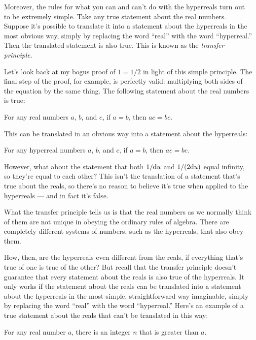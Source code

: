 Moreover, the
rules for what you can and can't do with the hyperreals turn out to be extremely simple. 
Take any true statement about the real numbers. Suppose it's possible to translate it into a statement about
the hyperreals in the most obvious way, simply by replacing the word ``real'' with the word ``hyperreal.''
Then the translated statement is also true. This is known as the \emph{transfer principle}.

Let's look back at my bogus proof of $1=1/2$ in light of this simple principle. The final step of the proof,
for example, is perfectly valid: multiplying both sides of the equation by the same thing. The following
statement about the real numbers is true:

\begin{indentedblock}
For any real numbers $a$, $b$, and $c$, if $a=b$, then $ac=bc$.
\end{indentedblock}

This can be translated in an obvious way into a statement about the hyperreals:

\begin{indentedblock}
For any hyperreal numbers $a$, $b$, and $c$, if $a=b$, then $ac=bc$.
\end{indentedblock}

However, what about the statement that both $1/\textup{d} u$ and $1/(2\textup{d} u)$ equal infinity, so they're
equal to each other? This isn't the translation of a statement that's true about the reals, so there's
no reason to believe it's true when applied to the hyperreals --- and in fact it's false.

What the transfer principle tells us is that the real numbers as we normally
think of them are not unique in obeying the ordinary rules of algebra. There are completely different
systems of numbers, such as the hyperreals, that also obey them.

How, then, are the hyperreals even
different from the reals, if everything that's true of one is true of the other? But recall that
the transfer principle doesn't guarantee that every statement about the reals is also true of the
hyperreals. It only works if the statement about the reals can be translated into a statement
about the hyperreals in the most simple, straightforward way imaginable, simply by replacing
the word ``real'' with the word ``hyperreal.'' Here's an example of a true statement about the reals that
can't be translated in this way:

\begin{indentedblock}
For any real number $a$, there is an integer $n$ that is greater than $a$.
\end{indentedblock}

